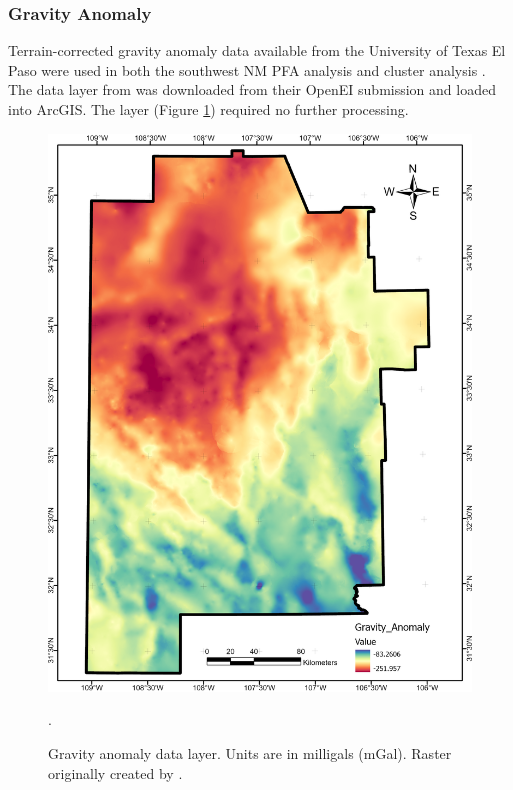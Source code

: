 \subsubsection{Gravity Anomaly}

Terrain-corrected gravity anomaly data available from the University of Texas El Paso \citep{utep_gravity_2011} were used in both the southwest NM PFA analysis \citep{bielicki_hydrogeolgic_2015} and cluster analysis \citep{pepin_new_2018}. The data layer from \citet{bielicki_hydrogeolgic_2015} was downloaded from their OpenEI submission \citep{kelley_geothermal_2015} and loaded into ArcGIS. The layer (Figure \ref{fig:feat_gravity}) required no further processing.

\begin{figure}[!htp]
\centering
\includegraphics[scale=.50]{templates/images/Figure-GravityAnomaly.png}
\caption[Gravity anomaly data layer]{Gravity anomaly data layer. Units are in milligals (mGal). Raster originally created by \protect\citet{bielicki_hydrogeolgic_2015}.}.
\label{fig:feat_gravity}
\end{figure}

